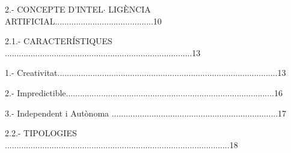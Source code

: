 \documentclass[12pt]{article}
\begin{document}
\vspace{\baselineskip}

\vspace{\baselineskip}
\begin{justify}
2.- CONCEPTE D’INTEL$ \cdot $ LIGÈNCIA ARTIFICIAL..........................................10
\end{justify}\par


\vspace{\baselineskip}
\begin{justify}
2.1.- CARACTERÍSTIQUES ................................................................................13
\end{justify}\par


\vspace{\baselineskip}

\vspace{\baselineskip}
\begin{adjustwidth}{0.49in}{0.0in}
1.- Creativitat..............................................................................................13\par

\end{adjustwidth}


\vspace{\baselineskip}
\begin{adjustwidth}{0.49in}{0.0in}
2.- Impredictible.........................................................................................16\par

\end{adjustwidth}


\vspace{\baselineskip}
\begin{adjustwidth}{0.49in}{0.0in}
3.- Independent i Autònoma .......................................................................17\par

\end{adjustwidth}


\vspace{\baselineskip}

\vspace{\baselineskip}
\begin{justify}
2.2.- TIPOLOGIES ................................................................................................18
\end{justify}\par
\end{document}
